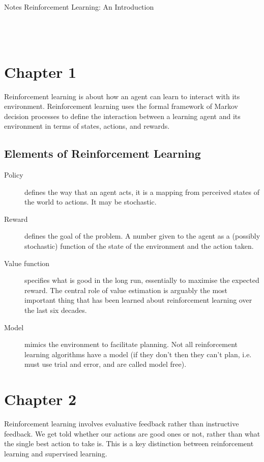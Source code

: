 \documentclass[a4paper, oneside, 11pt]{article}
\newcommand\Rule{\noindent\makebox[\textwidth]{\rule{\textwidth}{0.5pt}}}
\begin{document}
{\huge Notes} \hfill {\huge Reinforcement Learning: An Introduction}\\
\Rule\\
\tableofcontents
\mbox{}\\
\Rule
\mbox{}\\


\clearpage
\section{Chapter 1}
Reinforcement learning is about how an agent can learn to interact with its environment. Reinforcement learning uses the formal framework of Markov decision processes to define the interaction between a learning agent and its environment in terms of states, actions, and rewards.

\setcounter{subsection}{2}
\subsection{Elements of Reinforcement Learning}
\begin{description}
     \item[Policy] defines the way that an agent acts, it is a mapping from perceived states of the world to actions. It may be stochastic.
     \item[Reward] defines the goal of the problem. A number given to the agent as a (possibly stochastic) function of the state of the environment and the action taken.
     \item[Value function] specifies what is good in the long run, essentially to maximise the expected reward. The central role of value estimation is arguably the most important thing that has been learned about reinforcement learning over the last six decades.
     \item[Model] mimics the environment to facilitate planning. Not all reinforcement learning algorithms have a model (if they don't then they can't plan, i.e. must use trial and error, and are called model free).
\end{description}


\section{Chapter 2}
Reinforcement learning involves evaluative feedback rather than instructive feedback. We get told whether our actions are good ones or not, rather than what the single best action to take is. This is a key distinction between reinforcement learning and supervised learning.
\end{document}
